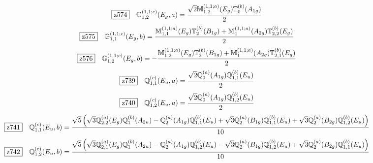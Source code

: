 \documentclass[fleqn,10pt,landscape]{jsarticle}
\begin{document}
\begin{dmath*}
\hspace*{3mm}\fbox{z574}\quad \mathbb{G}_{1,2}^{(1,1;c)}(E_{g},a)=\frac{\sqrt{2} \mathbb{M}_{1,2}^{(1,1;a)}(E_{g}) \mathbb{T}_{0}^{(b)}(A_{1g})}{2}
\end{dmath*}
\begin{dmath*}
\hspace*{3mm}\fbox{z575}\quad \mathbb{G}_{1,1}^{(1,1;c)}(E_{g},b)=\frac{\mathbb{M}_{1,1}^{(1,1;a)}(E_{g}) \mathbb{T}_{2}^{(b)}(B_{1g}) + \mathbb{M}_{1}^{(1,1;a)}(A_{2g}) \mathbb{T}_{2,2}^{(b)}(E_{g})}{2}
\end{dmath*}
\begin{dmath*}
\hspace*{3mm}\fbox{z576}\quad \mathbb{G}_{1,2}^{(1,1;c)}(E_{g},b)=- \frac{\mathbb{M}_{1,2}^{(1,1;a)}(E_{g}) \mathbb{T}_{2}^{(b)}(B_{1g}) + \mathbb{M}_{1}^{(1,1;a)}(A_{2g}) \mathbb{T}_{2,1}^{(b)}(E_{g})}{2}
\end{dmath*}
\begin{dmath*}
\hspace*{3mm}\fbox{z739}\quad \mathbb{Q}_{1,1}^{(c)}(E_{u},a)=\frac{\sqrt{2} \mathbb{Q}_{0}^{(a)}(A_{1g}) \mathbb{Q}_{1,1}^{(b)}(E_{u})}{2}
\end{dmath*}
\begin{dmath*}
\hspace*{3mm}\fbox{z740}\quad \mathbb{Q}_{1,2}^{(c)}(E_{u},a)=\frac{\sqrt{2} \mathbb{Q}_{0}^{(a)}(A_{1g}) \mathbb{Q}_{1,2}^{(b)}(E_{u})}{2}
\end{dmath*}
\begin{dmath*}
\hspace*{3mm}\fbox{z741}\quad \mathbb{Q}_{1,1}^{(c)}(E_{u},b)=\frac{\sqrt{5} \left(\sqrt{3} \mathbb{Q}_{2,2}^{(a)}(E_{g}) \mathbb{Q}_{1}^{(b)}(A_{2u}) - \mathbb{Q}_{2}^{(a)}(A_{1g}) \mathbb{Q}_{1,1}^{(b)}(E_{u}) + \sqrt{3} \mathbb{Q}_{2}^{(a)}(B_{1g}) \mathbb{Q}_{1,1}^{(b)}(E_{u}) + \sqrt{3} \mathbb{Q}_{2}^{(a)}(B_{2g}) \mathbb{Q}_{1,2}^{(b)}(E_{u})\right)}{10}
\end{dmath*}
\begin{dmath*}
\hspace*{3mm}\fbox{z742}\quad \mathbb{Q}_{1,2}^{(c)}(E_{u},b)=\frac{\sqrt{5} \left(\sqrt{3} \mathbb{Q}_{2,1}^{(a)}(E_{g}) \mathbb{Q}_{1}^{(b)}(A_{2u}) - \mathbb{Q}_{2}^{(a)}(A_{1g}) \mathbb{Q}_{1,2}^{(b)}(E_{u}) - \sqrt{3} \mathbb{Q}_{2}^{(a)}(B_{1g}) \mathbb{Q}_{1,2}^{(b)}(E_{u}) + \sqrt{3} \mathbb{Q}_{2}^{(a)}(B_{2g}) \mathbb{Q}_{1,1}^{(b)}(E_{u})\right)}{10}
\end{dmath*}
\end{document}
